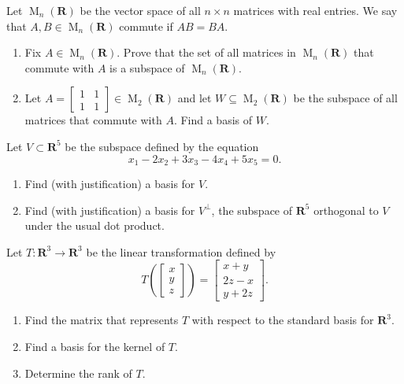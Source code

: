 \documentclass[11pt,twoside,openany]{memoir}
\begin{document}
    \begin{exercise}
    Let $\operatorname{M}_n(\mathbf{R})$ be the vector space of all $n \times n$ matrices with real entries. We say that $A, B \in \operatorname{M}_n(\mathbf{R})$ commute if $AB = BA$.
    \begin{enumerate}[label=(\alph*)]
        \item Fix $A \in \operatorname{M}_n(\mathbf{R})$. Prove that the set of all matrices in $\operatorname{M}_n(\mathbf{R})$ that commute with $A$ is a subspace of $\operatorname{M}_n(\mathbf{R})$.
        \item Let $A=\begin{bmatrix} 1 & 1 \\ 1 & 1  \end{bmatrix}\in \operatorname{M}_2(\mathbf{R})$ and let $W\subseteq \operatorname{M}_2(\mathbf{R})$ be the subspace of all matrices that commute with $A$. Find a basis of $W$. 
    \end{enumerate}
    \end{exercise}
    
    \begin{exercise}
    Let $V\subset \mathbf{R}^5$ be the subspace defined by the equation
    \[
    x_1-2x_2+3x_3-4x_4+5x_5=0.
    \]
    \begin{enumerate}[label=(\alph*)]
        \item Find (with justification) a basis for $V$.
        \item Find (with justification) a basis for $V^{\perp}$, the subspace of $\mathbf{R}^5$ orthogonal to $V$ under the usual dot product.
    \end{enumerate}
    \end{exercise}
    
    \newpage
    \begin{exercise}
    Let $T:\mathbf{R}^3\to \mathbf{R}^3$ be the linear transformation defined by
    \[
    T\left(\begin{bmatrix} x \\ y \\ z\end{bmatrix}\right) = \begin{bmatrix} x+y \\ 2z-x \\ y+2z\end{bmatrix}.
    \]
    \begin{enumerate}[label=(\alph*)]
        \item Find the matrix that represents $T$ with respect to the standard basis for $\mathbf{R}^3$.
        \item Find a basis for the kernel of $T$.
        \item Determine the rank of $T$.
    \end{enumerate}
    \end{exercise}
    
\end{document}
